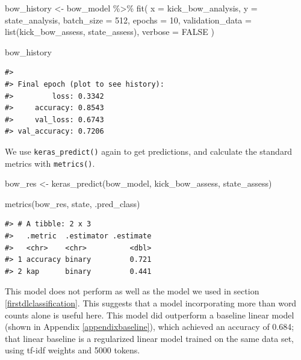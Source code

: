 \documentclass[
]{krantz}
\makeatletter
\newenvironment{Shaded}{\begin{snugshade}}{\end{snugshade}}
\newcommand{\AttributeTok}[1]{\textcolor[rgb]{0.77,0.63,0.00}{#1}}
\newcommand{\ConstantTok}[1]{\textcolor[rgb]{0.00,0.00,0.00}{#1}}
\newcommand{\DecValTok}[1]{\textcolor[rgb]{0.00,0.00,0.81}{#1}}
\newcommand{\FunctionTok}[1]{\textcolor[rgb]{0.00,0.00,0.00}{#1}}
\newcommand{\NormalTok}[1]{#1}
\newcommand{\OtherTok}[1]{\textcolor[rgb]{0.56,0.35,0.01}{#1}}
\newcommand{\SpecialCharTok}[1]{\textcolor[rgb]{0.00,0.00,0.00}{#1}}
\newenvironment{kframe}{%
\medskip{}
\setlength{\fboxsep}{.8em}
 \def\at@end@of@kframe{}%
 \ifinner\ifhmode%
  \def\at@end@of@kframe{\end{minipage}}%
  \begin{minipage}{\columnwidth}%
 \fi\fi%
 \def\FrameCommand##1{\hskip\@totalleftmargin \hskip-\fboxsep
 \colorbox{shadecolor}{##1}\hskip-\fboxsep
     \hskip-\linewidth \hskip-\@totalleftmargin \hskip\columnwidth}%
 \MakeFramed {\advance\hsize-\width
   \@totalleftmargin\z@ \linewidth\hsize
   \@setminipage}}%
 {\par\unskip\endMakeFramed%
 \at@end@of@kframe}
\renewenvironment{Shaded}{\begin{kframe}}{\end{kframe}}
\makeatother
\begin{document}
\begin{Shaded}
\begin{Highlighting}[]
\NormalTok{bow\_history }\OtherTok{\textless{}{-}}\NormalTok{ bow\_model }\SpecialCharTok{\%\textgreater{}\%}
  \FunctionTok{fit}\NormalTok{(}
    \AttributeTok{x =}\NormalTok{ kick\_bow\_analysis,}
    \AttributeTok{y =}\NormalTok{ state\_analysis,}
    \AttributeTok{batch\_size =} \DecValTok{512}\NormalTok{,}
    \AttributeTok{epochs =} \DecValTok{10}\NormalTok{,}
    \AttributeTok{validation\_data =} \FunctionTok{list}\NormalTok{(kick\_bow\_assess, state\_assess),}
    \AttributeTok{verbose =} \ConstantTok{FALSE}
\NormalTok{  )}

\NormalTok{bow\_history}
\end{Highlighting}
\end{Shaded}

\begin{verbatim}
#> 
#> Final epoch (plot to see history):
#>         loss: 0.3342
#>     accuracy: 0.8543
#>     val_loss: 0.6743
#> val_accuracy: 0.7206
\end{verbatim}

We use \texttt{keras\_predict()} again to get predictions, and calculate the standard metrics with \texttt{metrics()}.

\begin{Shaded}
\begin{Highlighting}[]
\NormalTok{bow\_res }\OtherTok{\textless{}{-}} \FunctionTok{keras\_predict}\NormalTok{(bow\_model, kick\_bow\_assess, state\_assess)}

\FunctionTok{metrics}\NormalTok{(bow\_res, state, .pred\_class)}
\end{Highlighting}
\end{Shaded}

\begin{verbatim}
#> # A tibble: 2 x 3
#>   .metric  .estimator .estimate
#>   <chr>    <chr>          <dbl>
#> 1 accuracy binary         0.721
#> 2 kap      binary         0.441
\end{verbatim}

This model does not perform as well as the model we used in section \ref{firstdlclassification}. This suggests that a model incorporating more than word counts alone is useful here. This model did outperform a baseline linear model (shown in Appendix \ref{appendixbaseline}), which achieved an accuracy of 0.684; that linear baseline is a regularized linear model trained on the same data set, using tf-idf weights and 5000 tokens.
\end{document}
